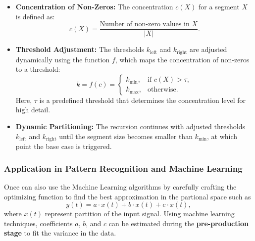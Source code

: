 \documentclass[onecolumn,conference]{IEEEtran}
\begin{document}
\begin{itemize}
    \item \textbf{Concentration of Non-Zeros:}  
    The concentration \( c(X) \) for a segment \( X \) is defined as:
    \[
    c(X) = \frac{\text{Number of non-zero values in } X}{|X|}.
    \]

    \item \textbf{Threshold Adjustment:}  
    The thresholds \( k_{\text{left}} \) and \( k_{\text{right}} \) are adjusted dynamically using the function \( f \), which maps the concentration of non-zeros to a threshold:
    \[
    k = f(c) = 
    \begin{cases} 
    k_{\text{min}}, & \text{if } c(X) > \tau, \\
    k_{\text{max}}, & \text{otherwise}.
    \end{cases}
    \]
    Here, \( \tau \) is a predefined threshold that determines the concentration level for high detail.

    \item \textbf{Dynamic Partitioning:}  
    The recursion continues with adjusted thresholds \( k_{\text{left}} \) and \( k_{\text{right}} \) until the segment size becomes smaller than \( k_{\text{min}} \), at which point the base case is triggered.
\end{itemize}

\subsubsection{Application in Pattern Recognition and Machine Learning}
Once can also use the Machine Learning algorithms by carefully crafting the optimizing function to find the best approximation in the partional space such as 
\[
y(t) = a \cdot x(t) + b \cdot x(t) + c \cdot x(t),
\]
where \( x(t) \) represent partition of the input signal. Using machine learning techniques, coefficients \( a \), \( b \), and \( c \) can be estimated during the \textbf{pre-production stage} to fit the variance in the data. 
\end{document}
